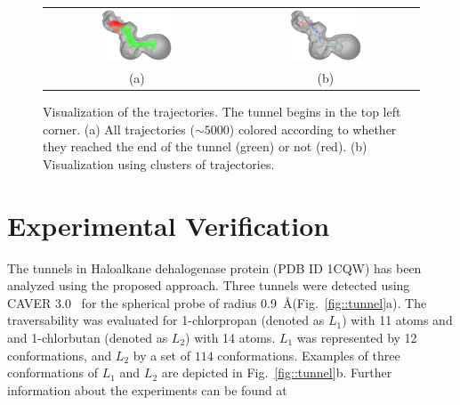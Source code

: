 \documentclass[letterpaper, 10 pt, conference]{ieeeconf} %
\def\LA{L_1}
\def\LB{L_2}
\begin{document}
\begin{figure}
\centering
\begin{tabular}{cc}
\includegraphics[width=0.4\textwidth]{fig/trajectories-all} &
\includegraphics[width=0.4\textwidth]{fig/trajectories-clustered-21} \\
(a) & (b) \\                       
\end{tabular}
\caption{Visualization of the trajectories. The tunnel begins in the top left corner.
(a) All trajectories ($\sim5000$) colored according to whether they reached the end of the tunnel (green) or not (red). 
(b) Visualization using clusters of trajectories. 
\label{fig:trajectories}
}
\end{figure}




\section{Experimental Verification}

The tunnels in Haloalkane dehalogenase protein (PDB ID 1CQW) has been analyzed using the proposed approach.
Three tunnels were detected using CAVER 3.0~\cite{caver3} for the spherical probe of radius 0.9~\AA (Fig.~\ref{fig::tunnel}a).
The traversability was evaluated for 1-chlorpropan (denoted as $\LA$) with 11 atoms and 
and 1-chlorbutan (denoted as $\LB$) with 14 atoms.
$\LA$ was represented by 12 conformations, and $\LB$ by a set of $114$ conformations.
Examples of three conformations of $\LA$ and $\LB$ are depicted in Fig.~\ref{fig::tunnel}b.
Further information about the experiments can be found at %
\end{document}
